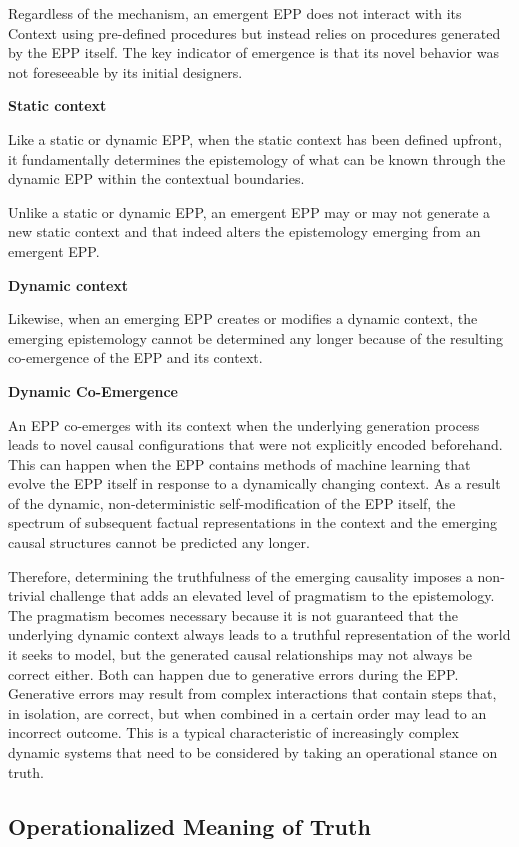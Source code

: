Regardless of the mechanism, an emergent EPP does not interact with its Context using pre-defined procedures but instead relies on procedures generated by the EPP itself. The key indicator of emergence is that its novel behavior was not foreseeable by its initial designers.

\textbf{Static context}

Like a static or dynamic EPP, when the static context has been defined upfront, it fundamentally determines the epistemology of what can be known through the dynamic EPP within the contextual boundaries.

Unlike a static or dynamic EPP, an emergent EPP may or may not generate a new static context and that indeed alters the epistemology emerging from an emergent EPP.

\textbf{Dynamic context}

Likewise, when an emerging EPP creates or modifies a dynamic context, the emerging epistemology cannot be determined any longer because of the resulting co-emergence of the EPP and its context.

\textbf{Dynamic Co-Emergence}

An EPP co-emerges with its context when the underlying generation process leads to novel causal configurations that were not explicitly encoded beforehand. This can happen when the EPP contains methods of machine learning that evolve the EPP itself in response to a dynamically changing context. As a result of the dynamic, non-deterministic self-modification of the EPP itself, the spectrum of subsequent factual representations in the context and the emerging causal structures cannot be predicted any longer.

Therefore, determining the truthfulness of the emerging causality imposes a non-trivial challenge that adds an elevated level of pragmatism to the epistemology. The pragmatism becomes necessary because it is not guaranteed that the underlying dynamic context always leads to a truthful representation of the world it seeks to model, but the generated causal relationships may not always be correct either. Both can happen due to generative errors during the EPP. Generative errors may result from complex interactions that contain steps that, in isolation, are correct, but when combined in a certain order may lead to an incorrect outcome. This is a typical characteristic of increasingly complex dynamic systems that need to be considered by taking an operational stance on truth.

\subsection{Operationalized Meaning of Truth}

